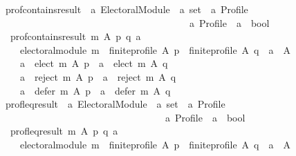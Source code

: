 \begin{isabellebody}
{\isafolddocument}%
%
\isadelimdocument
%
\endisadelimdocument
{}\isamarkupfalse%
\ prof{\isacharunderscore}{\kern0pt}contains{\isacharunderscore}{\kern0pt}result\ {\isacharcolon}{\kern0pt}{\isacharcolon}{\kern0pt}\ {\isachardoublequoteopen}{\isacharprime}{\kern0pt}a\ Electoral{\isacharunderscore}{\kern0pt}Module\ {\isasymRightarrow}\ {\isacharprime}{\kern0pt}a\ set\ {\isasymRightarrow}\ {\isacharprime}{\kern0pt}a\ Profile\ {\isasymRightarrow}\isanewline
\ \ \ \ \ \ \ \ \ \ \ \ \ \ \ \ \ \ \ \ \ \ \ \ \ \ \ \ \ \ \ \ \ \ \ \ \ \ \ {\isacharprime}{\kern0pt}a\ Profile\ {\isasymRightarrow}\ {\isacharprime}{\kern0pt}a\ {\isasymRightarrow}\ bool{\isachardoublequoteclose}\ \isanewline
\ \ {\isachardoublequoteopen}prof{\isacharunderscore}{\kern0pt}contains{\isacharunderscore}{\kern0pt}result\ m\ A\ p\ q\ a\ {\isasymequiv}\isanewline
\ \ \ \ electoral{\isacharunderscore}{\kern0pt}module\ m\ {\isasymand}\ finite{\isacharunderscore}{\kern0pt}profile\ A\ p\ {\isasymand}\ finite{\isacharunderscore}{\kern0pt}profile\ A\ q\ {\isasymand}\ a\ {\isasymin}\ A\ {\isasymand}\isanewline
\ \ \ \ {\isacharparenleft}{\kern0pt}a\ {\isasymin}\ elect\ m\ A\ p\ {\isasymlongrightarrow}\ a\ {\isasymin}\ elect\ m\ A\ q{\isacharparenright}{\kern0pt}\ {\isasymand}\isanewline
\ \ \ \ {\isacharparenleft}{\kern0pt}a\ {\isasymin}\ reject\ m\ A\ p\ {\isasymlongrightarrow}\ a\ {\isasymin}\ reject\ m\ A\ q{\isacharparenright}{\kern0pt}\ {\isasymand}\isanewline
\ \ \ \ {\isacharparenleft}{\kern0pt}a\ {\isasymin}\ defer\ m\ A\ p\ {\isasymlongrightarrow}\ a\ {\isasymin}\ defer\ m\ A\ q{\isacharparenright}{\kern0pt}{\isachardoublequoteclose}\isanewline
\isanewline
{}\isamarkupfalse%
\ prof{\isacharunderscore}{\kern0pt}leq{\isacharunderscore}{\kern0pt}result\ {\isacharcolon}{\kern0pt}{\isacharcolon}{\kern0pt}\ {\isachardoublequoteopen}{\isacharprime}{\kern0pt}a\ Electoral{\isacharunderscore}{\kern0pt}Module\ {\isasymRightarrow}\ {\isacharprime}{\kern0pt}a\ set\ {\isasymRightarrow}\ {\isacharprime}{\kern0pt}a\ Profile\ {\isasymRightarrow}\isanewline
\ \ \ \ \ \ \ \ \ \ \ \ \ \ \ \ \ \ \ \ \ \ \ \ \ \ \ \ \ \ \ \ \ \ {\isacharprime}{\kern0pt}a\ Profile\ {\isasymRightarrow}\ {\isacharprime}{\kern0pt}a\ {\isasymRightarrow}\ bool{\isachardoublequoteclose}\ \isanewline
\ \ {\isachardoublequoteopen}prof{\isacharunderscore}{\kern0pt}leq{\isacharunderscore}{\kern0pt}result\ m\ A\ p\ q\ a\ {\isasymequiv}\isanewline
\ \ \ \ electoral{\isacharunderscore}{\kern0pt}module\ m\ {\isasymand}\ finite{\isacharunderscore}{\kern0pt}profile\ A\ p\ {\isasymand}\ finite{\isacharunderscore}{\kern0pt}profile\ A\ q\ {\isasymand}\ a\ {\isasymin}\ A\ {\isasymand}\isanewline

\end{isabellebody}
